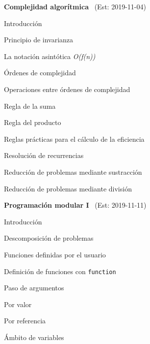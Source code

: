 \begin{longenum}
\begin{longenum}
    \end{longenum}
    \item \textbf{Complejidad algorítmica} \ (Est: 2019-11-04)
    \begin{longenum}
        \item Introducción
        \item Principio de invarianza
        \item La notación asintótica \textit{O(f(n))}
        \item Órdenes de complejidad
        \item Operaciones entre órdenes de complejidad
        \begin{longenum}
            \item Regla de la suma
            \item Regla del producto
        \end{longenum}
        \item Reglas prácticas para el cálculo de la eficiencia
        \item Resolución de recurrencias
        \begin{longenum}
            \item Reducción de problemas mediante sustracción
            \item Reducción de problemas mediante división
        \end{longenum}
    \end{longenum}
    \item \textbf{Programación modular I} \ (Est: 2019-11-11)
    \begin{longenum}
        \item Introducción
        \begin{longenum}
            \item Descomposición de problemas
        \end{longenum}
        \item Funciones definidas por el usuario
        \begin{longenum}
            \item Definición de funciones con \texttt{function}
            \item Paso de argumentos
            \begin{longenum}
                \item Por valor
                \item Por referencia
            \end{longenum}
            \item Ámbito de variables

\end{longenum}
\end{longenum}
\end{longenum}
